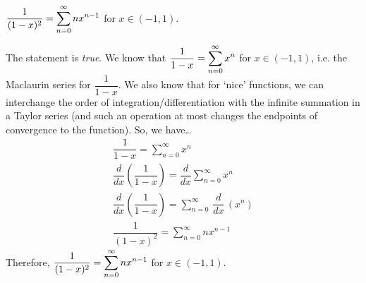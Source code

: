 \documentclass[11pt,letterpaper]{article}
\begin{document}
 $\displaystyle\dfrac{1}{(1 - x)^2}= \sum_{n=0}^\infty n x^{n-1}$ for $x \in (-1, 1)$. \pspace

\sol The statement is \textit{true}. We know that $\displaystyle\dfrac{1}{1 - x}= \sum_{n=0}^\infty x^n$ for $x \in (-1, 1)$, i.e. the Maclaurin series for $\dfrac{1}{1 - x}$. We also know that for `nice' functions, we can interchange the order of integration/differentiation with the infinite summation in a Taylor series (and such an operation at most changes the endpoints of convergence to the function). So, we have\dots
	\[
	\begin{gathered}
	\dfrac{1}{1 - x}= \sum_{n=0}^\infty x^n \\[0.1cm]
	\dfrac{d}{dx} \left( \dfrac{1}{1 - x} \right)= \dfrac{d}{dx} \sum_{n=0}^\infty x^n \\[0.1cm]
	\dfrac{d}{dx} \left( \dfrac{1}{1 - x} \right)= \sum_{n=0}^\infty\, \dfrac{d}{dx}\, \left( x^n \right) \\[0.1cm]
	\dfrac{1}{(1 - x)^2}= \sum_{n=0}^\infty n x^{n-1}
	\end{gathered}
	\]
Therefore, $\displaystyle\dfrac{1}{(1 - x)^2}= \sum_{n=0}^\infty n x^{n-1}$ for $x \in (-1, 1)$.
\end{document}
